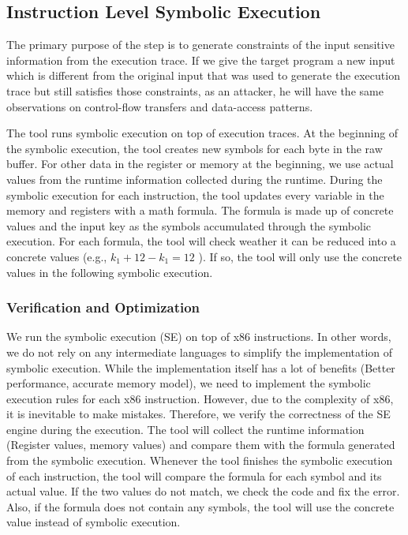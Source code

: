 \subsection{Instruction Level Symbolic Execution}
\label{InstructionSE}
The primary purpose of the step is to generate constraints of the input sensitive information from the execution trace. If we give the target program a new input which is different from the original input that was used to generate the execution trace but still satisfies those constraints, as an attacker, he will have the same observations on control-flow transfers and data-access patterns.

The tool runs symbolic execution on top of execution traces. At the beginning of the symbolic execution, the tool creates new symbols for each byte in the raw buffer. For other data in the register or memory at the beginning, we use actual values from the runtime information collected during the runtime. During the symbolic execution for each instruction, the tool updates every variable in the memory and registers with a math formula. The formula is made up of concrete values and the input key as the symbols accumulated through the symbolic execution.
For each formula, the tool will check weather it can be reduced into a concrete values (e.g., $k_1+12-k_1 = 12$ ). If so, the tool will only use the concrete values in the following symbolic execution.

\subsubsection{Verification and Optimization}
We run the symbolic execution (SE) on top of x86 instructions. In other words, we do not rely on any intermediate languages to simplify the implementation of symbolic execution. While the implementation itself has a lot of benefits (Better performance, accurate memory model), we need to implement the symbolic execution rules for each x86 instruction.
However, due to the complexity of x86, it is inevitable to make mistakes. Therefore, we verify the correctness of the SE engine during the execution.
The tool will collect the runtime information (Register values, memory values) and compare them with the formula generated from the symbolic execution. Whenever the tool finishes the symbolic execution of each instruction, the tool will compare the formula for each symbol and its actual value. If the two values do not match, we check the code and fix the error. Also, if the formula does not contain any symbols, the tool will use the concrete value instead of symbolic execution.

